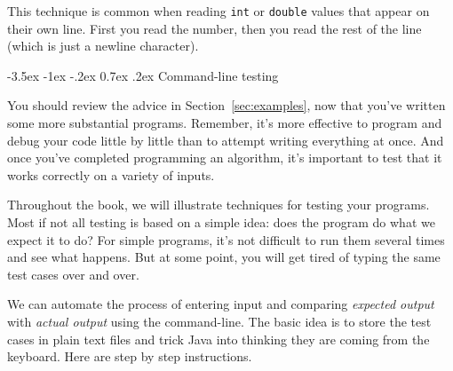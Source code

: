 \documentclass[12pt]{book}
\makeatletter
\theoremstyle{exercise}
\newcommand{\java}[1]{\verb"#1"}
\renewcommand{\section}{\@startsection{section}{1}{\z@}%
    {-3.5ex \@plus -1ex \@minus -.2ex}%
    {0.7ex \@plus.2ex}%
    {\normalfont\Large\bfseries}}
\newcommand{\java}[1]{\lstinline{#1}} %
\makeatother
\begin{document}
This technique is common when reading \java{int} or \java{double} values that appear on their own line.
First you read the number, then you read the rest of the line (which is just a newline character).


\section{Command-line testing}

You should review the advice in Section~\ref{sec:examples}, now that you've written some more substantial programs.
Remember, it's more effective to program and debug your code little by little than to attempt writing everything at once.
And once you've completed programming an algorithm, it's important to test that it works correctly on a variety of inputs.

Throughout the book, we will illustrate techniques for testing your programs.
Most if not all testing is based on a simple idea: does the program do what we expect it to do?
For simple programs, it's not difficult to run them several times and see what happens.
But at some point, you will get tired of typing the same test cases over and over.

We can automate the process of entering input and comparing {\em expected output} with {\em actual output} using the command-line.
The basic idea is to store the test cases in plain text files and trick Java into thinking they are coming from the keyboard.
Here are step by step instructions.
\end{document}
